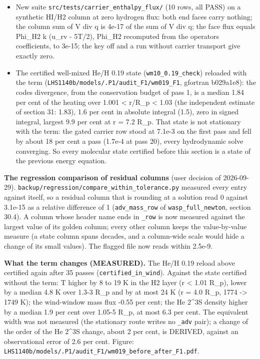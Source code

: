 \documentclass[english,a4paper]{my_memo}
\providecommand{\tightlist}{\setlength{\itemsep}{0pt}\setlength{\parskip}{0pt}}
\begin{document}
\begin{itemize}
\tightlist
\item
  New suite \texttt{src/tests/carrier\_enthalpy\_flux/} (10 rows, all PASS) on a
  synthetic HI/H2 column at zero hydrogen flux: both end faces carry
  nothing; the column sum of V div q is 4e-17 of the sum of \textbar V div q\textbar; the
  face flux equals Phi\_H2 k (u\_rv - 5T/2), Phi\_H2 recomputed from the
  operator\textquotesingle s coefficients, to 3e-15; the key off and a run without carrier
  transport give exactly zero.
\item
  The certified well-mixed He/H 0.19 state (\texttt{wm10\_0.19\_check}) reloaded with
  the term (\texttt{LHS1140b/models/.P1/audit\_F1/wm019\_F1}, gfortran b029a1e8): the
  code\textquotesingle s divergence, from the conservation budget of pass 1, is a median
  1.84 per cent of the heating over 1.001 \textless{} r/R\_p \textless{} 1.03 (the independent
  estimate of section 31: 1.83), 1.6 per cent in absolute integral (1.5),
  zero in signed integral, largest 9.9 per cent at r = 7.2 R\_p. That state is
  not stationary with the term: the gated carrier row stood at 7.1e-3 on
  the first pass and fell by about 18 per cent a pass (1.7e-4 at pass 20),
  every hydrodynamic solve converging. So every molecular state certified
  before this section is a state of the previous energy equation.
\end{itemize}

\textbf{The regression comparison of residual columns} (user decision of
2026-09-29). \texttt{backup/regression/compare\_within\_tolerance.py} measured every
entry against itself, so a residual column that is rounding at a solution
read 0 against 3.1e-15 as a relative difference of 1 (\texttt{adv\_mass\_row} of
\texttt{wasp\_full\_newton}, section 30.4). A column whose header name ends in \texttt{\_row}
is now measured against the largest value of its golden column; every other
column keeps the value-by-value measure (a state column spans decades, and
a column-wide scale would hide a change of its small values). The flagged
file now reads within 2.5e-9.

\textbf{What the term changes (MEASURED).} The He/H 0.19 reload above certified
again after 35 passes (\texttt{certified\_in\_wind}). Against the state certified
without the term: T higher by 8 to 19 K in the H2 layer (r \textless{} 1.01 R\_p),
lower by a median 4.8 K over 1.3-3 R\_p and by at most 24 K (r = 4.0 R\_p,
1774 -\textgreater{} 1749 K); the wind-window mass flux -0.55 per cent; the He 2\^{}3S
density higher by a median 1.9 per cent over 1.05-5 R\_p, at most 6.3 per
cent. The equivalent width was not measured (the stationary route writes no
\texttt{\_adv} pair); a change of the order of the He 2\^{}3S change, about 2 per cent,
is DERIVED, against an observational error of 2.6 per cent. Figure:
\texttt{LHS1140b/models/.P1/audit\_F1/wm019\_before\_after\_F1.pdf}.
\end{document}
